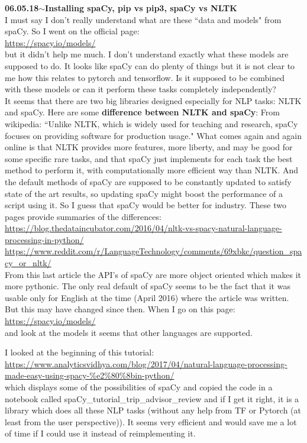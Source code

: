 \documentclass[11pt,a4paper]{article}
\newenvironment{loggentry}[2]%
{\noindent\textbf{#1}\hspace{1cm}$\mathbf{\sim}$\text{ }\textbf{#2}\\}{\vspace{0.5cm}}
\begin{document}
\begin{loggentry}{06.05.18}{Installing spaCy, pip vs pip3,  spaCy vs NLTK}
I must say I don't really understand what are these ``data and models" from spaCy. So I went on the official page:\\
\url{https://spacy.io/models/}\\
but it didn't help me much. I don't understand exactly what these models are supposed to do. It looks like spaCy can do plenty of things but it is not clear to me how this relates to pytorch and tensorflow. Is it supposed to be combined with these models or can it perform these tasks completely independently?\\
It seems that there are two big libraries designed especially for NLP tasks: NLTK and spaCy. Here are some \textbf{difference between NLTK and spaCy}: From wikipedia: ``Unlike NLTK, which is widely used for teaching and research, spaCy focuses on providing software for production usage." What comes again and again online is that NLTK provides more features, more liberty, and may be good for some specific rare tasks, and that spaCy just implements for each task the best method to perform it, with computationally more efficient way than NLTK. And the default methods of spaCy are supposed to be constantly updated to satisfy state of the art results, so updating spaCy might boost the performance of a script using it. So I guess that spaCy would be better for industry. These two pages provide summaries of the differences:\\
\url{https://blog.thedataincubator.com/2016/04/nltk-vs-spacy-natural-language-processing-in-python/}\\
\url{https://www.reddit.com/r/LanguageTechnology/comments/69xbkc/question_spacy_or_nltk/}\\
From this last article the API's of spaCy are more object oriented which makes it more pythonic. The only real default of spaCy seems to be the fact that it was usable only for English at the time (April 2016) where the article was written. But this may have changed since then. When I go on this page:\\
\url{https://spacy.io/models/}\\
and look at the models it seems that other languages are supported.

I looked at the beginning of this tutorial:\\
\url{https://www.analyticsvidhya.com/blog/2017/04/natural-language-processing-made-easy-using-spacy-%e2%80%8bin-python/}\\
which displays some of the possibilities of spaCy and copied the code in a notebook called spaCy\_tutorial\_trip\_advisor\_review and if I get it right, it is a library which does all these NLP tasks (without any help from TF or Pytorch (at least from the user perspective)). It seems very efficient and would save me a lot of time if I could use it instead of reimplementing it.
\end{loggentry}
\end{document}
